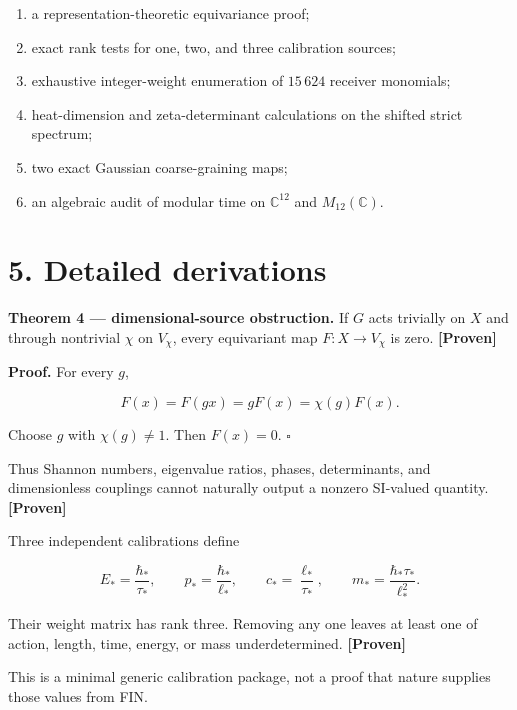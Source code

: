 \documentclass[11pt,a4paper,openany]{report}
\newcommand{\statusProven}{\textcolor{fingreen}{[Proven]}}
\begin{document}
\begin{enumerate}
\item 
a representation-theoretic equivariance proof;

\item 
exact rank tests for one, two, and three calibration sources;

\item 
exhaustive integer-weight enumeration of \(15\,624\) receiver monomials;

\item 
heat-dimension and zeta-determinant calculations on the shifted strict spectrum;

\item 
two exact Gaussian coarse-graining maps;

\item 
an algebraic audit of modular time on \(\mathbb C^{12}\) and \(M_{12}(\mathbb C)\).

\end{enumerate}

\section{5. Detailed derivations}

\textbf{Theorem 4 — dimensional-source obstruction.} If \(G\) acts trivially on \(X\) and through nontrivial \(\chi\) on \(V_\chi\), every equivariant map \(F:X\to V_\chi\) is zero. \textbf{\statusProven{}}

\textbf{Proof.} For every \(g\),

\[
F(x)=F(gx)=gF(x)=\chi(g)F(x).
\]

Choose \(g\) with \(\chi(g)\ne1\). Then \(F(x)=0\). \(\square\)

Thus Shannon numbers, eigenvalue ratios, phases, determinants, and dimensionless couplings cannot naturally output a nonzero SI-valued quantity. \textbf{\statusProven{}}

Three independent calibrations define

\[
E_*=\frac{\hbar_*}{\tau_*},\qquad
p_*=\frac{\hbar_*}{\ell_*},\qquad
c_*=\frac{\ell_*}{\tau_*},\qquad
m_*=\frac{\hbar_*\tau_*}{\ell_*^2}.
\]

Their weight matrix has rank three. Removing any one leaves at least one of action, length, time, energy, or mass underdetermined. \textbf{\statusProven{}}

This is a minimal generic calibration package, not a proof that nature supplies those values from FIN.
\end{document}
